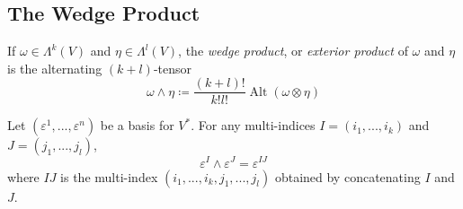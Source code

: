 \documentclass{article}
\DeclareMathOperator{\Alt}{Alt}
\newcounter{definition}[section]
\begin{document}
  \subsection{The Wedge Product}

    \begin{definition}
      \label{def:wedge-product}
    If $\omega \in \Lambda^k (V)$ and $\eta \in \Lambda^l (V)$, the \textit{wedge product}, or \textit{exterior product} of $\omega$ and $\eta$ is the alternating $(k+l)$-tensor 
    \begin{equation}
      \omega \wedge \eta \coloneqq \frac{(k+l)!}{k! l!} \Alt(\omega \otimes \eta)
    \end{equation}
    \end{definition}

    \begin{lemma}
      \label{thm:wedge-product-of-basis-covectors}
    Let $(\varepsilon^1, ..., \varepsilon^n)$ be a basis for $V^*$. For any multi-indices $I = (i_1, ..., i_k)$ and $J = (j_1, ..., j_l)$, 
    \begin{equation}
      \varepsilon^I \wedge \varepsilon^J = \varepsilon^{IJ}
    \end{equation}
    where $IJ$ is the multi-index $(i_1, ..., i_k, j_1, ..., j_l)$ obtained by concatenating $I$ and $J$. 
    \end{lemma}
\end{document}

